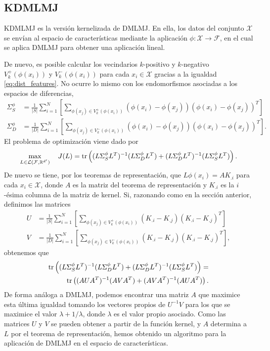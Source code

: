 \subsection{KDMLMJ}

KDMLMJ \cite{dmlmj} es la versión kernelizada de DMLMJ. En ella, los datos del conjunto $\mathcal{X}$ se envían al espacio de características mediante la aplicación $\phi\colon \mathcal{X} \to \mathcal{F}$, en el cual se aplica DMLMJ para obtener una aplicación lineal.

De nuevo, es posible calcular los vecindarios $k$-positivo y $k$-negativo $V_k^+(\phi(x_i))$ y $V_k^-(\phi(x_i))$ para cada $x_i \in \mathcal{X}$ gracias a la igualdad \ref{eq:dist_features}. No ocurre lo mismo con los endomorfismos asociadas a los espacios de diferencias,
\begin{align*}
    \Sigma_S^{\phi} &= \frac{1}{|S|}\sum_{i=1}^{N} \left[ \sum_{\phi(x_j) \in V_k^+(\phi(x_i))} (\phi(x_i)-\phi(x_j))(\phi(x_i)-\phi(x_j))^T\right] \\
    \Sigma_D^{\phi} &= \frac{1}{|D|}\sum_{i=1}^{N} \left[ \sum_{\phi(x_j) \in V_k^-(\phi(x_i))} (\phi(x_i)-\phi(x_j))(\phi(x_i)-\phi(x_j))^T\right].
\end{align*}
El problema de optimización viene dado por
\[ \max_{L \in \mathcal{L}(\mathcal{F}, \mathbb{R}^{d'})} \quad J(L) =  \operatorname{tr}\left( (L\Sigma_S^{\phi} L^T)^{-1} (L\Sigma_D^{\phi} L^T) + (L \Sigma_D^{\phi} L^T)^{-1} (L \Sigma_S^{\phi} L^T) \right).\]
 De nuevo se tiene, por los teoremas de representación, que $L\phi(x_i) = AK_{.i}$ para cada $x_i \in \mathcal{X}$, donde $A$ es la matriz del teorema de representación y $K_{.i}$ es la $i$-ésima columna de la matriz de kernel. Si, razonando como en la sección anterior, definimos las matrices
\begin{align*}
    U &= \frac{1}{|S|}\sum_{i=1}^{N} \left[ \sum_{\phi(x_j) \in V_k^+(\phi(x_i))} (K_{.i}-K_{.j})(K_{.i}-K_{.j})^T\right] \\
    V &= \frac{1}{|D|}\sum_{i=1}^{N} \left[ \sum_{\phi(x_j) \in V_k^-(\phi(x_i))} (K_{.i}-K_{.j})(K_{.i}-K_{.j})^T\right],
\end{align*}
obtenemos que
\begin{equation*}
    \begin{split}
        \operatorname{tr}\left( (L\Sigma_S^{\phi} L^T)^{-1} (L\Sigma_D^{\phi} L^T) + (L \Sigma_D^{\phi} L^T)^{-1} (L \Sigma_S^{\phi} L^T) \right) = \\
        \operatorname{tr}\left( (AUA^T)^{-1} (AV A^T) + (A V A^T)^{-1} (A U A^T) \right).
    \end{split}
\end{equation*}
De forma análoga a DMLMJ, podemos encontrar una matriz $A$ que maximice esta última igualdad tomando los vectores propios de $U^{-1}V$ para los que se maximice el valor $\lambda + 1 /\lambda$, donde $\lambda$ es el valor propio asociado. Como las matrices $U$ y $V$ se pueden obtener a partir de la función kernel, y $A$ determina a $L$ por el teorema de representación, hemos obtenido un algoritmo para la aplicación de DMLMJ en el espacio de características.


